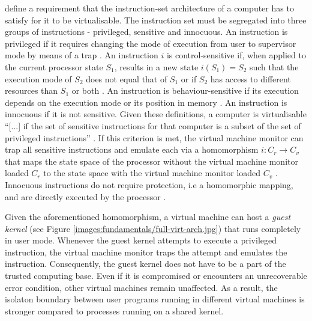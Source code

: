 \textcite{10.1145/361011.361073} define a requirement that the instruction-set architecture of a computer
has to satisfy for it to be virtualisable. The instruction set must be segregated into three groups of
instructions - privileged, sensitive and innocuous. An instruction is privileged if it requires changing
the mode of execution from user to supervisor mode by means of a trap \cite{10.1145/361011.361073}. 
An instruction $i$ is control-sensitive if, when applied to the current processor state $S_1$, results
in a new state $i(S_{1}) = S_{2}$ such that the execution mode of $S_{2}$ does not equal that of $S_{1}$
or if $S_{2}$ has access to different resources than $S_1$ or both \cite{10.1145/361011.361073}. 
An instruction is behaviour-sensitive if its execution depends on the execution mode or its position
in memory \cite{10.1145/361011.361073}. An instruction is innocuous if it is not sensitive. 
Given these definitions, a computer is virtualisable \enquote{[...] if the set of sensitive instructions
for that computer is a subset of the set of privileged instructions} \cite[6]{10.1145/361011.361073}.
If this criterion is met, the virtual machine monitor can trap all sensitive instructions and emulate 
each via a homomorphism $i: C_{r} \rightarrow C_{v}$ that maps the state space of the processor without
the virtual machine monitor loaded $C_{r}$ to the state space with the virtual machine monitor loaded 
$C_{v}$ \cite{10.1145/361011.361073}. Innocuous instructions do not require protection, i.e a homomorphic
mapping, and are directly executed by the processor \cite{10.1145/361011.361073}.

Given the aforementioned homomorphism, a virtual machine can host a \textit{guest kernel} 
(see Figure \ref{images:fundamentals/full-virt-arch.jpg}) that runs completely in user mode. 
Whenever the guest kernel attempts to execute a privileged instruction, 
the virtual machine monitor traps the attempt and emulates the instruction. 
Consequently, the guest kernel does not have to be a part of the trusted computing base. 
Even if it is compromised or encounters an unrecoverable error condition, other virtual machines 
remain unaffected. As a result, the isolaton boundary between user programs running in different 
virtual machines is stronger compared to processes running on a shared kernel. 

